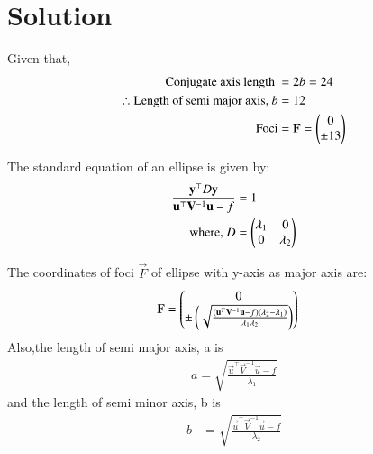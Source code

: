 \documentclass[journal,12pt,twocolumn]{IEEEtran}
\begin{document}
\section{Solution}
Given that,
\begin{align}
\text{Conjugate axis length }&= 2b = 24 
\\
\therefore \text{Length of semi major axis, } b&=12\label{eqA}
  \\
\text{Foci}&=\mathbf{F} = \begin{pmatrix}0\\\pm13\end{pmatrix} \label{eqB}
\end{align}
\begin{lemma}
\label{lemma}
The standard equation of an ellipse is given by:
\begin{align}
\frac{\mathbf{y}^{\top}D\mathbf{y}}{\mathbf{u}^{\top}\mathbf{V}^{-1}\mathbf{u}-f}&=1
\\
\text{where, } D &=\begin{pmatrix}\lambda_1& 0 \\ 0 & \lambda_2\end{pmatrix}
\end{align}
\end{lemma}
\begin{lemma}
The coordinates of foci $\vec{F}$ of ellipse  with y-axis as major axis are:
 \begin{align}
  \mathbf{F} &= \begin{pmatrix}0\\ \pm \left(\sqrt{\frac{(\mathbf{u}^T\mathbf{V}^{-1}\mathbf{u}-f)(\lambda_2-\lambda_1)}{\lambda_1\lambda_2}}\right)\end{pmatrix} \label{eqC}
\end{align}
Also,the length of semi major axis, a is
\begin{align}
  a = \sqrt{\frac{\vec{u}^{\top}\vec{V}^{-1}\vec{u}-f}{\lambda_1}} 
  \end{align}
and the length of semi minor axis, b is
  \begin{align}
  b &= \sqrt{\frac{\vec{u}^{\top}\vec{V}^{-1}\vec{u}-f}{\lambda_2}} \label{eqD}
 \end{align}
\end{lemma}
\end{document}
